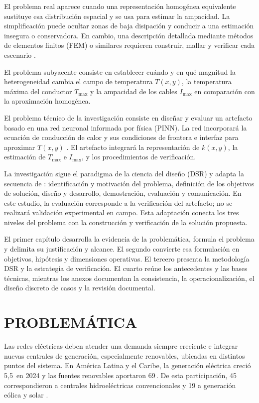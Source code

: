 \documentclass[11pt,a4paper,oneside]{report}
\newcommand{\Tmax}{T_{\max}}
\newcommand{\Imax}{I_{\max}}
\newcommand{\kx}{k(x,y)}
\newcommand{\pct}{\mbox{\char37}}
\begin{document}
El problema real aparece cuando una representación homogénea equivalente sustituye esa distribución espacial y se usa para estimar la ampacidad. La simplificación puede ocultar zonas de baja disipación y conducir a una estimación insegura o conservadora. En cambio, una descripción detallada mediante métodos de elementos finitos (FEM) o similares requieren construir, mallar y verificar cada escenario \parencites[41--42,93--99]{cigre2025}[1--3,12]{aldulaimi2024}.

El problema subyacente consiste en establecer cuándo y en qué magnitud la heterogeneidad cambia el campo de temperatura \(T(x,y)\), la temperatura máxima del conductor \(\Tmax\) y la ampacidad de los cables \(\Imax\) en comparación con la aproximación homogénea.

El problema técnico de la investigación consiste en diseñar y evaluar un artefacto basado en una red neuronal informada por física (PINN). La red incorporará la ecuación de conducción de calor y sus condiciones de frontera e interfaz para aproximar \(T(x,y)\) \parencite{raissi2019}. El artefacto integrará la representación de \(\kx\), la estimación de \(\Tmax\) e \(\Imax\), y los procedimientos de verificación.

La investigación sigue el paradigma de la ciencia del diseño (DSR) y adapta la secuencia de \textcite[54--56]{peffers2007}: identificación y motivación del problema, definición de los objetivos de solución, diseño y desarrollo, demostración, evaluación y comunicación. En este estudio, la evaluación corresponde a la verificación del artefacto; no se realizará validación experimental en campo. Esta adaptación conecta los tres niveles del problema con la construcción y verificación de la solución propuesta.

El primer capítulo desarrolla la evidencia de la problemática, formula el problema y delimita su justificación y alcance. El segundo convierte esa formulación en objetivos, hipótesis y dimensiones operativas. El tercero presenta la metodología DSR y la estrategia de verificación. El cuarto reúne los antecedentes y las bases técnicas, mientras los anexos documentan la consistencia, la operacionalización, el diseño discreto de casos y la revisión documental.

\section{PROBLEMÁTICA}

Las redes eléctricas deben atender una demanda siempre creciente e integrar nuevas centrales de generación, especialmente renovables, ubicadas en distintos puntos del sistema. En América Latina y el Caribe, la generación eléctrica creció 5,5\,\pct{} en 2024 y las fuentes renovables aportaron 69\,\pct{}. De esta participación, 45\,\pct{} correspondieron a centrales hidroeléctricas convencionales y 19 a generación eólica y solar \parencite{olade2025generacionALC2024}.
\end{document}
